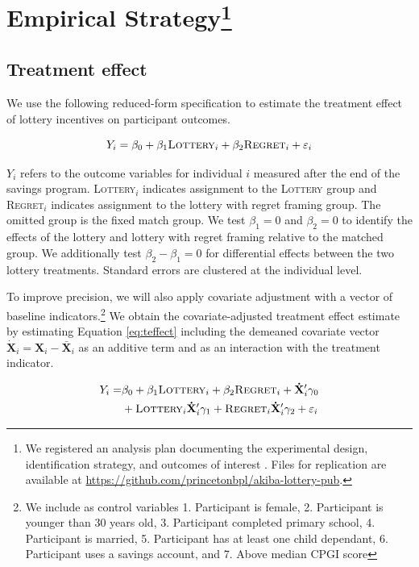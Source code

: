 \documentclass[12pt]{article}
\begin{document}
\section{Empirical Strategy\protect\footnote{We registered an analysis plan documenting the experimental design, identification strategy, and outcomes of interest . Files for replication are available at \url{https://github.com/princetonbpl/akiba-lottery-pub}.}} \label{sec:est}

	\subsection{Treatment effect}

		We use the following reduced-form specification to estimate the treatment effect of lottery incentives on participant outcomes.

		\begin{equation} \label{eq:teffect}
			Y_{i} = \beta_{0} + \beta_{1}\text{\textsc{Lottery}}_{i} + \beta_{2}\text{\textsc{Regret}}_{i} + \varepsilon_{i}
		\end{equation}

		$Y_{i}$ refers to the outcome variables for individual $i$ measured after the end of the savings program. \textsc{Lottery}$_i$ indicates assignment to the \textsc{Lottery} group and \textsc{Regret}$_i$ indicates assignment to the lottery with regret framing group. The omitted group is the fixed match group. We test $\beta_{1} = 0$ and $\beta_{2} = 0$ to identify the effects of the lottery and lottery with regret framing relative to the matched group. We additionally test $\beta_{2} - \beta_{1} = 0$ for differential effects between the two lottery treatments. Standard errors are clustered at the individual level.

		To improve precision, we will also apply covariate adjustment with a vector of baseline indicators.\footnote{We include as control variables 1. Participant is female, 2. Participant is younger than 30 years old, 3. Participant completed primary school, 4. Participant is married, 5. Participant has at least one child dependant, 6. Participant uses a savings account, and 7. Above median CPGI score} We obtain the covariate-adjusted treatment effect estimate by estimating Equation \ref{eq:teffect} including the demeaned covariate vector $\mathbf{\dot X}_{i} = \mathbf{X}_{i} - \mathbf{\bar X}_{i}$ as an additive term and as an interaction with the treatment indicator.

		\begin{equation} \begin{split} \label{eq:controls}
			Y_{i} = & \beta_{0} + \beta_{1}\text{\textsc{Lottery}}_{i} + \beta_{2}\text{\textsc{Regret}}_{i} + \mathbf{\dot X}'_i \gamma_{0} \\
					& + \text{\textsc{Lottery}}_{i} \mathbf{\dot X}'_i \gamma_{1} + \text{\textsc{Regret}}_{i} \mathbf{\dot X}'_i \gamma_{2} + \varepsilon_{i}
		\end{split} \end{equation}
\end{document}
